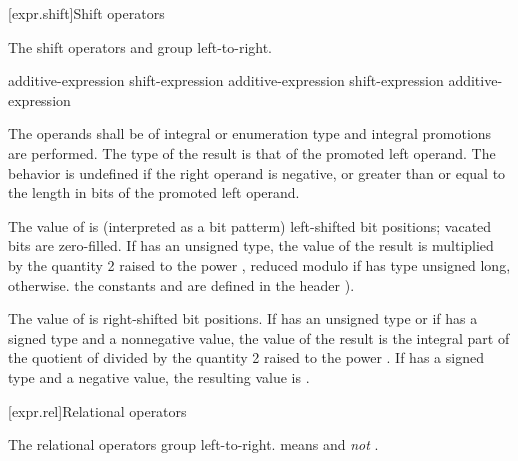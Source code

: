 [expr.shift]{Shift operators}

\pnum
{}%
%
%
%
%
The shift operators \tcode{\shl} and \tcode{\shr} group left-to-right.

%
%
%
%
%
\begin{bnf}
\br
    additive-expression\br
    shift-expression \terminal{\shl} additive-expression\br
    shift-expression \terminal{\shr} additive-expression
\end{bnf}

The operands shall be of integral or enumeration type and integral
promotions are performed. The type of the result is that of the promoted
left operand.
%
The behavior is undefined if the right operand is negative, or greater
than or equal to the length in bits of the promoted left operand.

\pnum
The value of  is  (interpreted as a bit
patterm) left-shifted  bit positions; vacated bits are
zero-filled. If  has an unsigned type, the value of the result
is  multiplied by the quantity 2 raised to the power ,
reduced modulo  if  has type unsigned long,
 otherwise.
\enternote the constants  and  are defined
in the header ). \exitnote

\pnum
The value of  is  right-shifted 
bit positions. If  has an unsigned type or if  has a
signed type and a nonnegative value, the value of the result is the
integral part of the quotient of  divided by the quantity 2
raised to the power . If 
%
has a signed type and a negative value, the resulting value is
.

[expr.rel]{Relational operators}%
%

\pnum
The relational operators group left-to-right.
\enterexample 
{} means  and \emph{not}
.
\exitexample 

